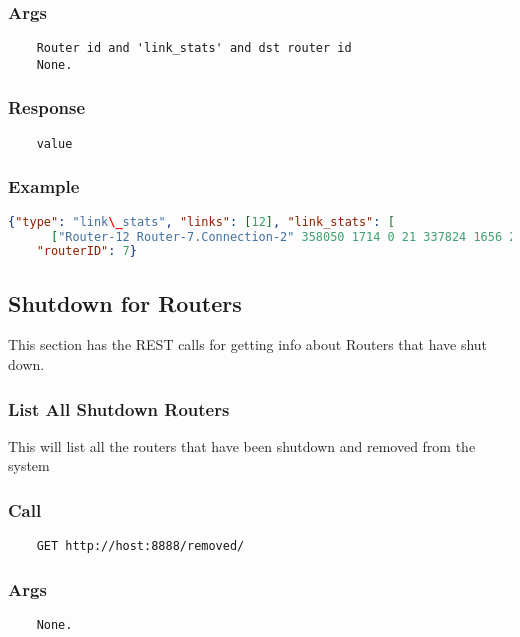 \subsubsection*{Args}
\begin{verbatim}
	Router id and 'link_stats' and dst router id
	None.
\end{verbatim}

\subsubsection*{Response}
\begin{verbatim}
	value
\end{verbatim}

\subsubsection*{Example}
\begin{lstlisting}[language=json]
  {"type": "link\_stats", "links": [12], "link_stats": [
      ["Router-12 Router-7.Connection-2" 358050 1714 0 21 337824 1656 228431 1078 0 0 205428 1007 0 1 0 1]],
    "routerID": 7}
\end{lstlisting}


\subsection{Shutdown for Routers}

This section has the REST calls for getting info about Routers that have shut down.

\hr
\subsubsection{List All Shutdown Routers}
This will list all the routers that have been shutdown and removed from the system
\subsubsection*{Call}
\begin{verbatim}
	GET http://host:8888/removed/
\end{verbatim}

\subsubsection*{Args}
\begin{verbatim}
	None.
\end{verbatim}

